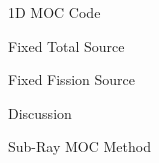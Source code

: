 \begin{frame}[t]{1D MOC Code}
    
    
    
\end{frame}


\begin{frame}[t]{Fixed Total Source}
    
    
    
\end{frame}


\begin{frame}[t]{Fixed Fission Source}
    
    
    
\end{frame}


\begin{frame}[t]{Discussion}
    
    
    
\end{frame}


\begin{frame}[t]{Sub-Ray MOC Method}
    
    
    
\end{frame}